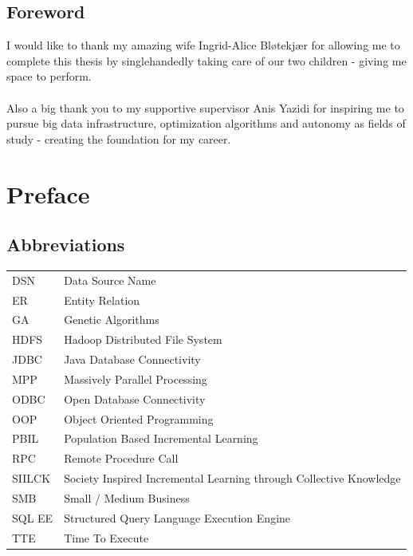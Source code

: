 \documentclass[a4paper,english]{report}
\begin{document}
	\pagebreak
	\section{Foreword}
	
	I would like to thank my amazing wife Ingrid-Alice Bløtekjær for allowing me to complete this thesis by singlehandedly taking care of our two children - giving me space to perform.
	\\
	\\
	Also a big thank you to my supportive supervisor Anis Yazidi for inspiring me to pursue big data infrastructure, optimization algorithms and autonomy as fields of study - creating the foundation for my career.
	
	\tableofcontents
	
	\chapter{Preface}
	\section{Abbreviations}
	\label{word_list}
	\begin{table}[h]
		\centering
		\begin{tabular}{ll}
			
			DSN & Data Source Name \\
			ER & Entity Relation \\
			GA & Genetic Algorithms \\
			HDFS & Hadoop Distributed File System \\
			JDBC & Java Database Connectivity \\
			MPP & Massively Parallel Processing \\
			ODBC & Open Database Connectivity \\
			OOP	& Object Oriented Programming \\
			PBIL & Population Based Incremental Learning \\
			RPC & Remote Procedure Call \\
			SIILCK & Society Inspired Incremental Learning through Collective Knowledge \\
			SMB & Small / Medium Business \\
			SQL EE & Structured Query Language Execution Engine \\
			TTE	& Time To Execute \\
			
		\end{tabular}
	\end{table}
\end{document}
